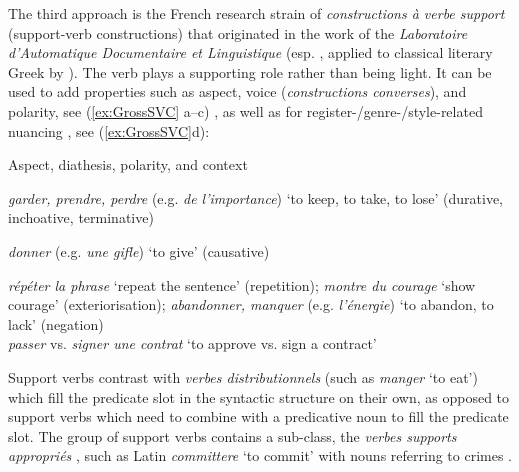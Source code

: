 \documentclass[output=paper,colorlinks,citecolor=brown]{langscibook}
\begin{document}
The third approach is the French research strain of \textit{constructions à verbe support} (support-verb constructions) that originated in the work of the \textit{Laboratoire d'Automatique Documentaire et Linguistique} (esp. \citealt{grossFonctionSemantiqueVerbes1998}, applied to classical literary Greek by \citealt{jimenezlopezSupportVerbConstructions2016}). The verb plays a supporting role rather than being light. It can be used to add properties such as aspect, voice (\textit{constructions converses}), and polarity, see (\ref{ex:GrossSVC} a–c) \citep{giry-schneiderNominalisationsFrancaisOperateur1978, vivesAvoirPrendrePerdre1983, grossConstructionsConversesFrancais1989}, as well as for register-/genre-/style-related nuancing \citep{biberRegisterGenreStyle2009, melcukVerbesSupportsSans2004}, see (\ref{ex:GrossSVC}d): 


\ea\label{ex:GrossSVC}
Aspect, diathesis, polarity, and context \citep{grossFonctionSemantiqueVerbes1998}


\ea \textit{garder, prendre, perdre} (e.g. \textit{de l'importance}) ‘to keep, to take, to lose’ (durative, inchoative, terminative)


\ex \textit{donner} (e.g. \textit{une gifle}) ‘to give’ (causative)


\ex \textit{répéter la phrase} ‘repeat the sentence’ (repetition); \textit{montre du courage} ‘show courage’ (exteriorisation); \textit{abandonner, manquer} (e.g. \textit{l'énergie}) ‘to abandon, to lack’ (negation) \\


\ex \textit{passer} vs. \textit{signer une contrat} ‘to approve vs. sign a contract’ \\
\z
\z

Support verbs contrast with \textit{verbes distributionnels} (such as \textit{manger} ‘to eat’) which fill the predicate slot in the syntactic structure on their own, as opposed to support verbs which need to combine with a predicative noun to fill the predicate slot. The group of support verbs contains a sub-class, the \textit{verbes supports appropriés} \citep{grossManuelAnalyseLinguistique2012}, such as Latin \textit{committere} ‘to commit’ with nouns referring to crimes \citep{roeschFacinusFacereFacinus2018}. 
\end{document}
